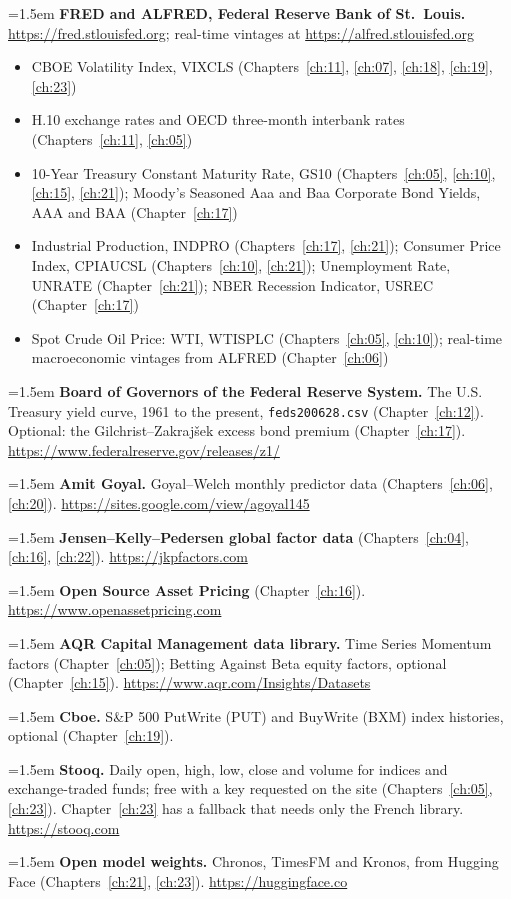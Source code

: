 \hangindent=1.5em \textbf{FRED and ALFRED, Federal Reserve Bank of St.\ Louis.} \url{https://fred.stlouisfed.org}; real-time vintages at \url{https://alfred.stlouisfed.org}
\begin{itemize}\setlength{\itemsep}{0pt}\setlength{\parskip}{0pt}
  \item CBOE Volatility Index, VIXCLS (Chapters~\ref{ch:11}, \ref{ch:07}, \ref{ch:18}, \ref{ch:19}, \ref{ch:23})
  \item H.10 exchange rates and OECD three-month interbank rates (Chapters~\ref{ch:11}, \ref{ch:05})
  \item 10-Year Treasury Constant Maturity Rate, GS10 (Chapters~\ref{ch:05}, \ref{ch:10}, \ref{ch:15}, \ref{ch:21}); Moody's Seasoned Aaa and Baa Corporate Bond Yields, AAA and BAA (Chapter~\ref{ch:17})
  \item Industrial Production, INDPRO (Chapters~\ref{ch:17}, \ref{ch:21}); Consumer Price Index, CPIAUCSL (Chapters~\ref{ch:10}, \ref{ch:21}); Unemployment Rate, UNRATE (Chapter~\ref{ch:21}); NBER Recession Indicator, USREC (Chapter~\ref{ch:17})
  \item Spot Crude Oil Price: WTI, WTISPLC (Chapters~\ref{ch:05}, \ref{ch:10}); real-time macroeconomic vintages from ALFRED (Chapter~\ref{ch:06})
\end{itemize}

\hangindent=1.5em \textbf{Board of Governors of the Federal Reserve System.} The U.S. Treasury yield curve, 1961 to the present, \texttt{feds200628.csv} (Chapter~\ref{ch:12}). Optional: the Gilchrist--Zakraj\v{s}ek excess bond premium (Chapter~\ref{ch:17}). \url{https://www.federalreserve.gov/releases/z1/}

\hangindent=1.5em \textbf{Amit Goyal.} Goyal--Welch monthly predictor data (Chapters~\ref{ch:06}, \ref{ch:20}). \url{https://sites.google.com/view/agoyal145}



\hangindent=1.5em \textbf{Jensen--Kelly--Pedersen global factor data} (Chapters~\ref{ch:04}, \ref{ch:16}, \ref{ch:22}). \url{https://jkpfactors.com}

\hangindent=1.5em \textbf{Open Source Asset Pricing} (Chapter~\ref{ch:16}). \url{https://www.openassetpricing.com}

\hangindent=1.5em \textbf{AQR Capital Management data library.} Time Series Momentum factors (Chapter~\ref{ch:05}); Betting Against Beta equity factors, optional (Chapter~\ref{ch:15}). \url{https://www.aqr.com/Insights/Datasets}

\hangindent=1.5em \textbf{Cboe.} S\&P 500 PutWrite (PUT) and BuyWrite (BXM) index histories, optional (Chapter~\ref{ch:19}).

\hangindent=1.5em \textbf{Stooq.} Daily open, high, low, close and volume for indices and exchange-traded funds; free with a key requested on the site (Chapters~\ref{ch:05}, \ref{ch:23}). Chapter~\ref{ch:23} has a fallback that needs only the French library. \url{https://stooq.com}

\hangindent=1.5em \textbf{Open model weights.} Chronos, TimesFM and Kronos, from Hugging Face (Chapters~\ref{ch:21}, \ref{ch:23}). \url{https://huggingface.co}

\endgroup
